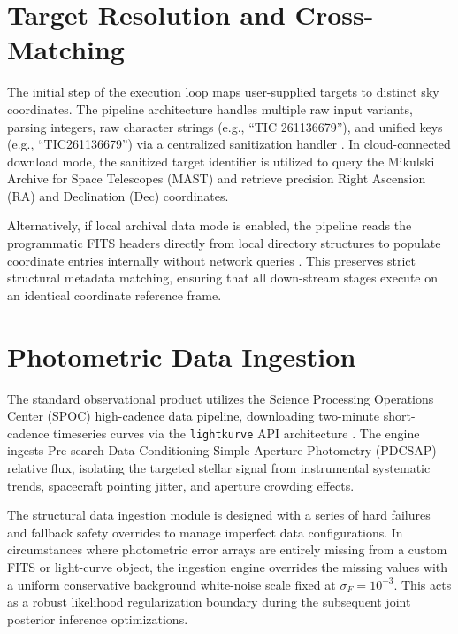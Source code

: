 \documentclass[12pt,a4paper,oneside]{report}
\newcommand{\code}[1]{\texttt{\small #1}}
\begin{document}
\section{Target Resolution and Cross-Matching}
The initial step of the execution loop maps user-supplied targets to distinct sky coordinates. The pipeline architecture handles multiple raw input variants, parsing integers, raw character strings (e.g., ``TIC 261136679''), and unified keys (e.g., ``TIC261136679'') via a centralized sanitization handler \cite{tess_exoplanet_pipeline.zip:tests/test_download.py}. In cloud-connected download mode, the sanitized target identifier is utilized to query the Mikulski Archive for Space Telescopes (MAST) and retrieve precision Right Ascension (RA) and Declination (Dec) coordinates. 

Alternatively, if local archival data mode is enabled, the pipeline reads the programmatic FITS headers directly from local directory structures to populate coordinate entries internally without network queries \cite{tess_exoplanet_pipeline.zip:tests/test_download.py}. This preserves strict structural metadata matching, ensuring that all down-stream stages execute on an identical coordinate reference frame.

\section{Photometric Data Ingestion}
The standard observational product utilizes the Science Processing Operations Center (SPOC) high-cadence data pipeline, downloading two-minute short-cadence timeseries curves via the \code{lightkurve} API architecture \cite{tess_exoplanet_pipeline.zip:pyproject.toml,tess_exoplanet_pipeline.zip:pbs_query/run_bayesian_test.out}. The engine ingests Pre-search Data Conditioning Simple Aperture Photometry (PDCSAP) relative flux, isolating the targeted stellar signal from instrumental systematic trends, spacecraft pointing jitter, and aperture crowding effects. 

The structural data ingestion module is designed with a series of hard failures and fallback safety overrides to manage imperfect data configurations. In circumstances where photometric error arrays are entirely missing from a custom FITS or light-curve object, the ingestion engine overrides the missing values with a uniform conservative background white-noise scale fixed at \(\sigma_{F} = 10^{-3}\). This acts as a robust likelihood regularization boundary during the subsequent joint posterior inference optimizations.
\end{document}
